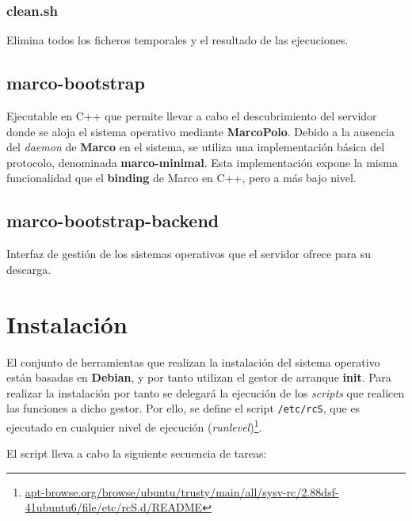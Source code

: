 \documentclass{article}
\begin{document}
\subsubsection*{clean.sh}

Elimina todos los ficheros temporales y el resultado de las ejecuciones.

\subsection{marco-bootstrap}

Ejecutable en C++ que permite llevar a cabo el descubrimiento del servidor donde se aloja el sistema operativo mediante \textbf{MarcoPolo}. Debido a la ausencia del \textit{daemon} de \textbf{Marco} en el sistema, se utiliza una implementación básica del protocolo, denominada \textbf{marco-minimal}. Esta implementación expone la misma funcionalidad que el \textbf{binding} de Marco en C++, pero a más bajo nivel.

\subsection{marco-bootstrap-backend}

Interfaz de gestión de los sistemas operativos que el servidor ofrece para su descarga.

\section{Instalación}

El conjunto de herramientas que realizan la instalación del sistema operativo están basadas en \textbf{Debian}, y por tanto utilizan el gestor de arranque \textbf{init}. Para realizar la instalación por tanto se delegará la ejecución de los \textit{scripts} que realicen las funciones a dicho gestor. Por ello, se define el script \texttt{/etc/rcS}, que es ejecutado en cualquier nivel de ejecución (\textit{runlevel})\footnote{\href{http://apt-browse.org/browse/ubuntu/trusty/main/all/sysv-rc/2.88dsf-41ubuntu6/file/etc/rcS.d/README}{apt-browse.org/browse/ubuntu/trusty/main/all/sysv-rc/2.88dsf-41ubuntu6/file/etc/rcS.d/README}}. 

El script lleva a cabo la siguiente secuencia de tareas:
\end{document}
